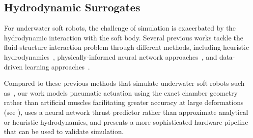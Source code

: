 \subsection{Hydrodynamic Surrogates}
For underwater soft robots, the challenge of simulation is exacerbated by the hydrodynamic interaction with the soft body.
Several previous works tackle the fluid-structure interaction problem through different methods, including heuristic hydrodynamics~\cite{du2021underwater,ma2021diffaqua,min2019softcon}, physically-informed neural network approaches~\cite{wandel_learning_2021}, and data-driven learning approaches~\cite{chen2018neural}.

Compared to these previous methods that simulate underwater soft robots such as~\cite{du2021underwater}, our work models pneumatic actuation using the exact chamber geometry rather than artificial muscles facilitating greater accuracy at large deformations (see ), uses a neural network thrust predictor rather than approximate analytical or heuristic hydrodynamics, and presents a more sophisticated hardware pipeline that can be used to validate simulation. 